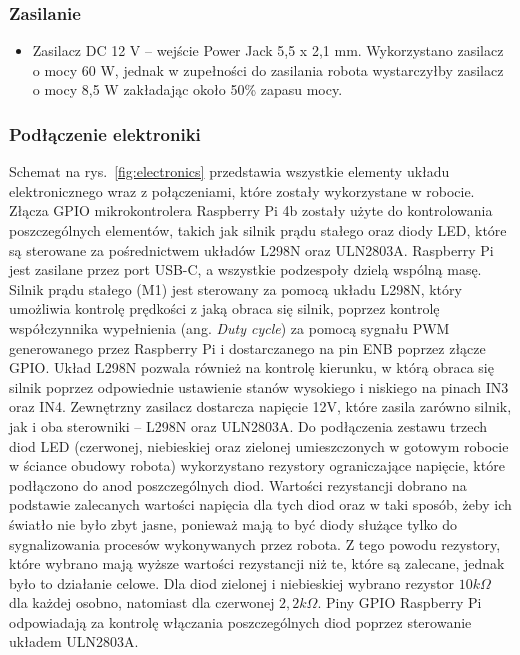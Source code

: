 \subsubsection{Zasilanie}
\begin{itemize}
    \item Zasilacz DC 12 V -- wejście Power Jack 5,5 x 2,1 mm. Wykorzystano zasilacz o mocy 60 W, jednak w zupełności do zasilania robota wystarczyłby zasilacz o mocy 8,5 W zakładając około 50\% zapasu mocy.
\end{itemize}

\subsubsection{Podłączenie elektroniki}

Schemat na rys.~\ref{fig:electronics} przedstawia wszystkie elementy układu elektronicznego wraz z połączeniami, które zostały wykorzystane w robocie.
Złącza GPIO mikrokontrolera Raspberry Pi 4b zostały użyte do kontrolowania poszczególnych elementów, takich jak silnik prądu stałego oraz diody LED, które są sterowane za 
pośrednictwem układów L298N oraz ULN2803A. Raspberry Pi jest zasilane przez port USB-C, a wszystkie podzespoły dzielą wspólną masę.
Silnik prądu stałego (M1) jest sterowany za pomocą układu L298N, który umożliwia kontrolę prędkości z jaką obraca się silnik, poprzez kontrolę współczynnika wypełnienia (ang. \textit{Duty cycle})
za pomocą sygnału PWM generowanego przez Raspberry Pi i dostarczanego na pin ENB poprzez złącze GPIO. Układ L298N pozwala również na kontrolę kierunku, w którą obraca się silnik poprzez
odpowiednie ustawienie stanów wysokiego i niskiego na pinach IN3 oraz IN4.
Zewnętrzny zasilacz dostarcza napięcie 12V, które zasila zarówno silnik, jak i oba sterowniki -- L298N oraz ULN2803A.
Do podłączenia zestawu trzech diod LED (czerwonej, niebieskiej oraz zielonej umieszczonych w gotowym robocie w ściance obudowy robota) wykorzystano rezystory ograniczające napięcie, które podłączono 
do anod poszczególnych diod. Wartości rezystancji dobrano na podstawie zalecanych wartości napięcia dla tych diod oraz w taki sposób, żeby ich światło nie było zbyt jasne, ponieważ 
mają to być diody służące tylko do sygnalizowania procesów wykonywanych przez robota. Z tego powodu rezystory, które wybrano mają wyższe wartości rezystancji niż te, które są zalecane, jednak było to
działanie celowe. Dla diod zielonej i niebieskiej wybrano rezystor $10 k\Omega$ dla każdej osobno, natomiast dla czerwonej $2{,}2 k\Omega$. Piny GPIO Raspberry Pi odpowiadają za kontrolę włączania poszczególnych diod poprzez sterowanie układem ULN2803A.
